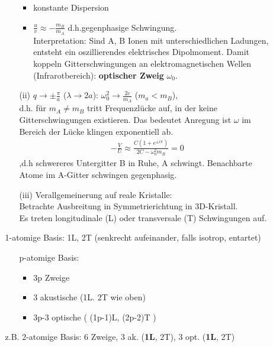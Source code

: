 \begin{itemize}
\begin{itemize}
\begin{itemize}
			\begin{itemize}
				\item konstante Dispersion
				\item $\frac{u}{v} \approx - \frac{m_B}{m_A}$
				d.h.gegenphasige Schwingung.\\
				Interpretation: Sind A, B Ionen mit unterschiedlichen Ladungen, entsteht ein oszillierendes elektrisches Dipolmoment. Damit koppeln Gitterschwingungen an elektromagnetischen Wellen (Infrarotbereich): \textbf{optischer Zweig} $\omega_0$.
			\end{itemize}
			\item[(ii)]  $q \rightarrow \pm \frac{\pi}{a}$ ($\lambda \rightarrow 2a$): $\omega_0^2 \rightarrow \frac{2c}{m_A}$ ($m_a < m_B$),\\
			d.h. für $m_A \neq m_B$ tritt Frequenzlücke auf, in der keine Gitterschwingungen existieren. Das bedeutet Anregung ist $\omega$ im Bereich der Lücke klingen exponentiell ab.
			\begin{align*}
				-\frac{V}{U}\approx \frac{C(1+e^{\pm i\pi})}{2C-\omega_0^2m_B} = 0
			\end{align*}
			,d.h schwereres Untergitter B in Ruhe, A schwingt. Benachbarte Atome im A-Gitter schwingen gegenphasig.
			\item[(iii)] Verallgemeinerung auf reale Kristalle:\\
			Betrachte Ausbreitung in Symmetrierichtung in 3D-Kristall.\\
			Es treten longitudinale (L) oder transversale (T) Schwingungen auf.
		\end{itemize} 
		1-atomige Basis: 1L, 2T (senkrecht aufeinander, falls isotrop, entartet)\\
		\begin{itemize}
			\item[p-atomige Basis:]
			\begin{itemize}
				\item 3p Zweige
				\item 3 akustische (1L. 2T wie oben)
				\item 3p-3 optische ( (1p-1)L,  (2p-2)T )
			\end{itemize} 
		\end{itemize}
		z.B. 2-atomige Basis: 6 Zweige, 3 ak. (\textbf{1L}, 2T), 3 opt. (\textbf{1L}, 2T)
	\end{itemize}
\end{itemize}




